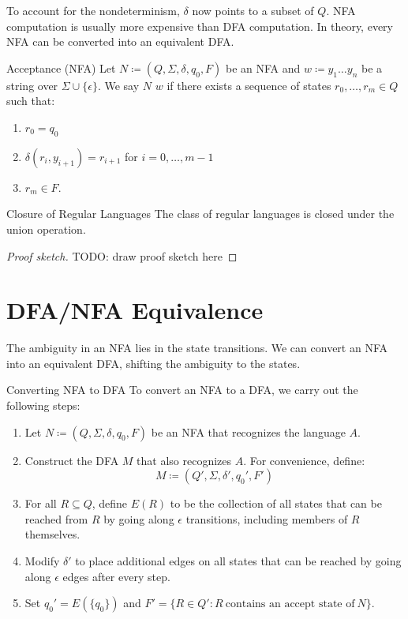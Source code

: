 \documentclass[12pt]{report}
\begin{document}
To account for the nondeterminism, $\delta$ now points to a subset of $Q$. NFA computation is usually more expensive than DFA computation. In theory, every NFA can be converted into an equivalent DFA.

\begin{dfnbox}{Acceptance (NFA)}{}
    Let $N \coloneq (Q, \Sigma, \delta, q_0, F)$ be an NFA and $w \coloneq y_1 \ldots y_n$ be a string over $\Sigma \cup \{\epsilon\}$. We say $N$  $w$ if there exists a sequence of states $r_0, \ldots, r_m \in Q$ such that:
    \begin{enumerate}[noitemsep]
        \item $r_0 = q_0$
        \item $\delta(r_i, y_{i+1}) = r_{i+1}$ for $i = 0, \ldots, m-1$
        \item $r_m \in F$.
    \end{enumerate}
\end{dfnbox}

\begin{thmbox}{Closure of Regular Languages}{}
    The class of regular languages is closed under the union operation.
    \tcblower
    \begin{proof}[Proof sketch]
        TODO: draw proof sketch here
    \end{proof}
\end{thmbox}

\section{DFA/NFA Equivalence}

The ambiguity in an NFA lies in the state transitions. We can convert an NFA into an equivalent DFA, shifting the ambiguity to the states.

\begin{tecbox}{Converting NFA to DFA}{}
    To convert an NFA to a DFA, we carry out the following steps:
    \begin{enumerate}
        \item Let $N \coloneq (Q, \Sigma, \delta, q_0, F)$ be an NFA that recognizes the language $A$.
        \item Construct the DFA $M$ that also recognizes $A$. For convenience, define:
        \[ M \coloneq (Q\prime, \Sigma, \delta\prime, q_0\prime, F\prime) \]
        \item For all $R \subseteq Q$, define $E(R)$ to be the collection of all states that can be reached from $R$ by going along $\epsilon$ transitions, including members of $R$ themselves.
        \item Modify $\delta\prime$ to place additional edges on all states that can be reached by going along $\epsilon$ edges after every step.
        \item Set $q_0\prime = E(\{q_0\})$ and $F\prime = \{ R \in Q\prime : R\ \text{contains an accept state of}\ N \}$.
    \end{enumerate}
\end{tecbox}
\end{document}
